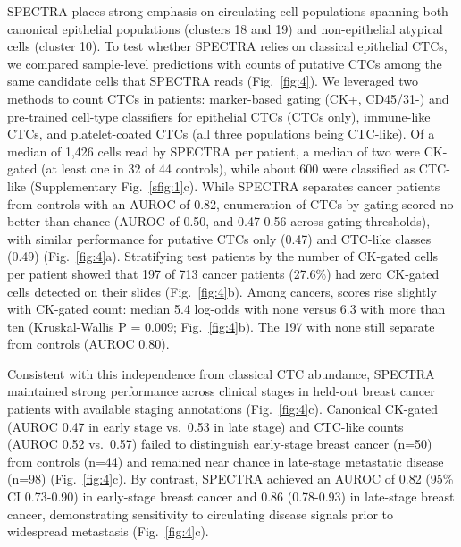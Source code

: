\documentclass[11pt]{article}
\begin{document}
SPECTRA places strong emphasis on circulating cell populations spanning both canonical epithelial populations (clusters 18 and 19) and non-epithelial atypical cells (cluster 10). To test whether SPECTRA relies on classical epithelial CTCs, we compared sample-level predictions with counts of putative CTCs among the same candidate cells that SPECTRA reads (Fig.~\ref{fig:4}). We leveraged two methods to count CTCs in patients: marker-based gating (CK+, CD45/31-)\cite{allard2004} and pre-trained cell-type classifiers for epithelial CTCs (CTCs only), immune-like CTCs, and platelet-coated CTCs (all three populations being CTC-like)\cite{naghdloo2025blue}. Of a median of 1,426 cells read by SPECTRA per patient, a median of two were CK-gated (at least one in 32 of 44 controls), while about 600 were classified as CTC-like (Supplementary Fig.~\ref{sfig:1}c). While SPECTRA separates cancer patients from controls with an AUROC of 0.82, enumeration of CTCs by gating scored no better than chance (AUROC of 0.50, and 0.47-0.56 across gating thresholds), with similar performance for putative CTCs only (0.47) and CTC-like classes (0.49) (Fig.~\ref{fig:4}a). Stratifying test patients by the number of CK-gated cells per patient showed that 197 of 713 cancer patients (27.6\%) had zero CK-gated cells detected on their slides (Fig.~\ref{fig:4}b). Among cancers, scores rise slightly with CK-gated count: median 5.4 log-odds with none versus 6.3 with more than ten (Kruskal-Wallis P = 0.009; Fig.~\ref{fig:4}b). The 197 with none still separate from controls (AUROC 0.80).

Consistent with this independence from classical CTC abundance, SPECTRA maintained strong performance across clinical stages in held-out breast cancer patients with available staging annotations (Fig.~\ref{fig:4}c). Canonical CK-gated (AUROC 0.47 in early stage vs.\ 0.53 in late stage) and CTC-like counts (AUROC 0.52 vs.\ 0.57) failed to distinguish early-stage breast cancer (n=50) from controls (n=44) and remained near chance in late-stage metastatic disease (n=98) (Fig.~\ref{fig:4}c). By contrast, SPECTRA achieved an AUROC of 0.82 (95\% CI 0.73-0.90) in early-stage breast cancer and 0.86 (0.78-0.93) in late-stage breast cancer, demonstrating sensitivity to circulating disease signals prior to widespread metastasis (Fig.~\ref{fig:4}c).
\end{document}
